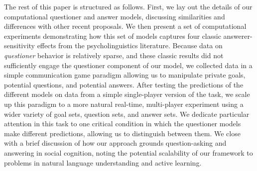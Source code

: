 \documentclass[12pt, floatsintext, man]{apa6}
\begin{document}
The rest of this paper is structured as follows. First, we lay out the details of our computational questioner and answer models, discussing similarities and differences with other recent proposals.
We then present a set of computational experiments demonstrating how this set of models captures four classic answerer-sensitivity effects from the psycholinguistics literature. Because data on \emph{questioner} behavior is relatively sparse, and these classic results did not sufficiently engage the questioner component of our model, we collected data in a simple communication game paradigm allowing us to manipulate private goals, potential questions, and potential answers. After testing the predictions of the different models on data from a simple single-player version of the task, we scale up this paradigm to a more natural real-time, multi-player experiment using a wider variety of goal sets, question sets, and answer sets. We dedicate particular attention in this task to one critical condition in which the questioner models make different predictions, allowing us to distinguish between them.
We close with a brief discussion of how our approach grounds question-asking and answering in social cognition, noting the potential scalability of our framework to problems in natural language understanding and active learning.
\end{document}
